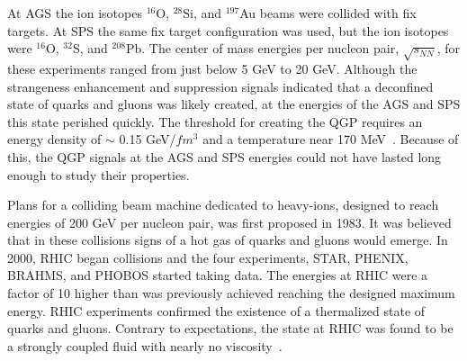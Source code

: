   At AGS the ion isotopes $^{16}$O, $^{28}$Si, and $^{197}$Au beams were 
    collided with fix targets. 
  At SPS the same fix target configuration was used, but the ion isotopes were 
    $^{16}$O, $^{32}$S, and $^{208}$Pb.
  The center of mass energies per nucleon pair, $\sqrt{s_{NN}}$, for these 
    experiments ranged from just below 5 GeV to 20 GeV. 
  Although the strangeness enhancement and \JPsi{} suppression 
    signals indicated that a deconfined state of quarks and gluons was likely 
    created, at the energies of the AGS and SPS this state perished quickly. 
  The threshold for creating the QGP requires an energy density of $\sim$ 0.15 
    GeV/$fm$$^{3}$ and a temperature near 170 MeV~\cite{Karsch:2000kv,Hands:2001ve}.
  Because of this, the QGP signals at the AGS and SPS energies could 
    not have lasted long enough to study their properties. 

  Plans for a colliding beam machine dedicated to heavy-ions, designed to reach 
    energies of 200 GeV per nucleon pair, was first proposed in 1983.
  It was believed that in these collisions signs of a hot gas of quarks and 
    gluons would emerge.
  In 2000, RHIC began collisions and the four experiments,
    STAR, PHENIX, BRAHMS, and PHOBOS started taking data. 
  The energies at RHIC were a factor of 10 higher than was previously achieved
    reaching the designed maximum energy. 
  RHIC experiments confirmed the existence of a thermalized state of quarks and 
    gluons.
  Contrary to expectations, the state at RHIC was found to be 
    a strongly coupled fluid with nearly no viscosity~\cite{longrage2008}.


